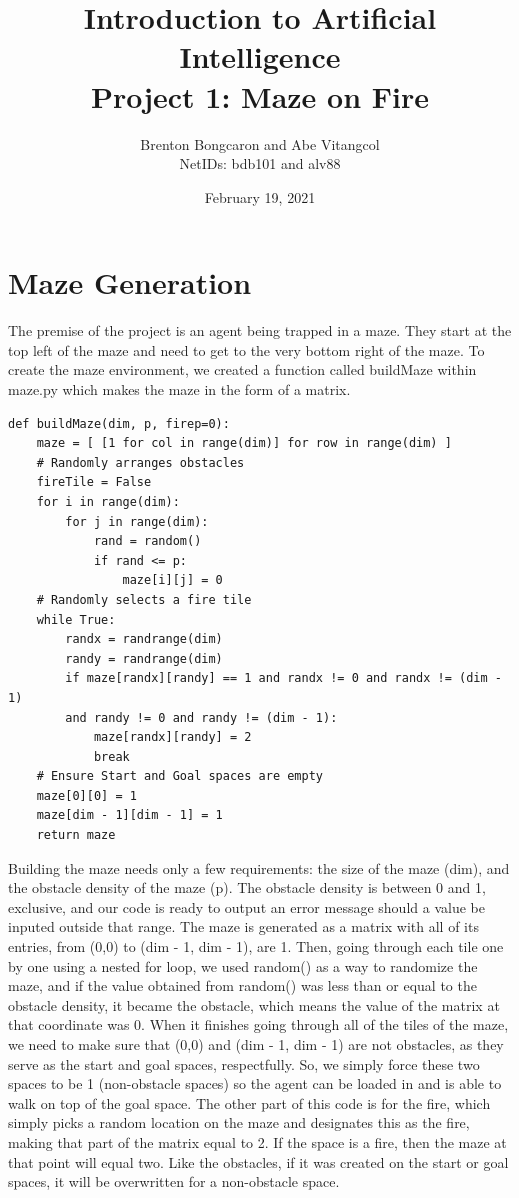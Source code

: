 \documentclass[11pt]{article}
\title{\textbf{Introduction to Artificial Intelligence\\
		\large Project 1: Maze on Fire}}
\author{Brenton Bongcaron and Abe Vitangcol\\NetIDs: bdb101 and alv88}
\date{February 19, 2021}
\begin{document}
	\maketitle
	\pagebreak
\section{Maze Generation}
The premise of the project is an agent being trapped in a maze. They start at the top left of the maze and need to get to the very bottom right of the maze. To create the maze environment, we created a function called buildMaze within maze.py which makes the maze in the form of a matrix.
\begin{verbatim}
def buildMaze(dim, p, firep=0):
    maze = [ [1 for col in range(dim)] for row in range(dim) ]
    # Randomly arranges obstacles
    fireTile = False
    for i in range(dim):
        for j in range(dim):
            rand = random()
            if rand <= p:
                maze[i][j] = 0
    # Randomly selects a fire tile
    while True:
        randx = randrange(dim)
        randy = randrange(dim)
        if maze[randx][randy] == 1 and randx != 0 and randx != (dim - 1)
        and randy != 0 and randy != (dim - 1):
            maze[randx][randy] = 2
            break
    # Ensure Start and Goal spaces are empty
    maze[0][0] = 1
    maze[dim - 1][dim - 1] = 1
    return maze

\end{verbatim}
Building the maze needs only a few requirements: the size of the maze (dim), and the obstacle density of the maze (p). The obstacle density is between 0 and 1, exclusive, and our code is ready to output an error message should a value be inputed outside that range. The maze is generated as a matrix with all of its entries, from (0,0) to (dim - 1, dim - 1), are 1. Then, going through each tile one by one using a nested for loop, we used random() as a way to randomize the maze, and if the value obtained from random() was less than or equal to the obstacle density, it became the obstacle, which means the value of the matrix at that coordinate was 0. When it finishes going through all of the tiles of the maze, we need to make sure that (0,0) and (dim - 1, dim - 1) are not obstacles, as they serve as the start and goal spaces, respectfully. So, we simply force these two spaces to be 1 (non-obstacle spaces) so the agent can be loaded in and is able to walk on top of the goal space.
The other part of this code is for the fire, which simply picks a random location on the maze and designates this as the fire, making that part of the matrix equal to 2. If the space is a fire, then the maze at that point will equal two. Like the obstacles, if it was created on the start or goal spaces, it will be overwritten for a non-obstacle space.
	\pagebreak
\end{document}
